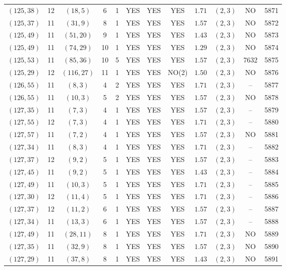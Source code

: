 \begin{longtable}{|c|c|c|c|c|c|c|c|c|c|c|c|}
$(125,38)$ & 12 & $(18,5)$ & 6 & 1 & YES & YES & YES & $1.71$ & $(2,3)$ & NO & 5871\\
$(125,37)$ & 11 & $(31,9)$ & 8 & 1 & YES & YES & YES & $1.57$ & $(2,3)$ & NO & 5872\\
$(125,49)$ & 11 & $(51,20)$ & 9 & 1 & YES & YES & YES & $1.43$ & $(2,3)$ & NO & 5873\\
$(125,49)$ & 11 & $(74,29)$ & 10 & 1 & YES & YES & YES & $1.29$ & $(2,3)$ & NO & 5874\\
$(125,53)$ & 11 & $(85,36)$ & 10 & 5 & YES & YES & YES & $1.57$ & $(2,3)$ & 7632 & 5875\\
$(125,29)$ & 12 & $(116,27)$ & 11 & 1 & YES & YES & NO(2) & $1.50$ & $(2,3)$ & NO & 5876\\
$(126,55)$ & 11 & $(8,3)$ & 4 & 2 & YES & YES & YES & $1.71$ & $(2,3)$ & -- & 5877\\
$(126,55)$ & 11 & $(10,3)$ & 5 & 2 & YES & YES & YES & $1.57$ & $(2,3)$ & NO & 5878\\
$(127,35)$ & 11 & $(7,3)$ & 4 & 1 & YES & YES & YES & $1.57$ & $(2,3)$ & -- & 5879\\
$(127,55)$ & 12 & $(7,3)$ & 4 & 1 & YES & YES & YES & $1.71$ & $(2,3)$ & -- & 5880\\
$(127,57)$ & 11 & $(7,2)$ & 4 & 1 & YES & YES & YES & $1.57$ & $(2,3)$ & NO & 5881\\
$(127,34)$ & 11 & $(8,3)$ & 4 & 1 & YES & YES & YES & $1.71$ & $(2,3)$ & -- & 5882\\
$(127,37)$ & 12 & $(9,2)$ & 5 & 1 & YES & YES & YES & $1.57$ & $(2,3)$ & -- & 5883\\
$(127,45)$ & 11 & $(9,2)$ & 5 & 1 & YES & YES & YES & $1.43$ & $(2,3)$ & -- & 5884\\
$(127,49)$ & 11 & $(10,3)$ & 5 & 1 & YES & YES & YES & $1.71$ & $(2,3)$ & -- & 5885\\
$(127,30)$ & 12 & $(11,4)$ & 5 & 1 & YES & YES & YES & $1.71$ & $(2,3)$ & -- & 5886\\
$(127,37)$ & 12 & $(11,2)$ & 6 & 1 & YES & YES & YES & $1.57$ & $(2,3)$ & -- & 5887\\
$(127,34)$ & 11 & $(13,3)$ & 6 & 1 & YES & YES & YES & $1.57$ & $(2,3)$ & -- & 5888\\
$(127,49)$ & 11 & $(28,11)$ & 8 & 1 & YES & YES & YES & $1.71$ & $(2,3)$ & NO & 5889\\
$(127,35)$ & 11 & $(32,9)$ & 8 & 1 & YES & YES & YES & $1.57$ & $(2,3)$ & NO & 5890\\
$(127,29)$ & 11 & $(37,8)$ & 8 & 1 & YES & YES & YES & $1.43$ & $(2,3)$ & NO & 5891\\

\end{longtable}
